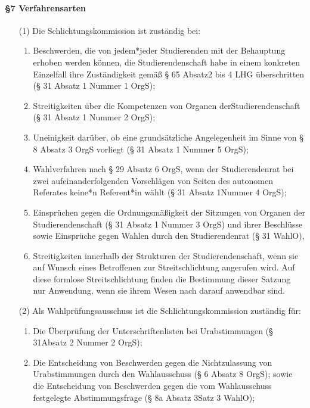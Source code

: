         \paragraph{§7 Verfahrensarten}
            \begin{itemize}
                \item[(1)]Die Schlichtungskommission ist zuständig bei:
                    \begin{enumerate}
                        \item Beschwerden, die von jedem*jeder Studierenden mit der Behauptung erhoben werden können, die Studierendenschaft habe in einem konkreten Einzelfall ihre Zuständigkeit gemäß § 65 Absatz2 bis 4 LHG überschritten (§ 31 Absatz 1 Nummer 1 OrgS);
                        \item Streitigkeiten über die Kompetenzen von Organen derStudierendenschaft (§ 31 Absatz 1 Nummer 2 OrgS);
                        \item Uneinigkeit darüber, ob eine grundsätzliche Angelegenheit im Sinne von § 8 Absatz 3 OrgS vorliegt (§ 31 Absatz 1 Nummer 5 OrgS);
                        \item Wahlverfahren nach § 29 Absatz 6 OrgS, wenn der Studierendenrat bei zwei aufeinanderfolgenden Vorschlägen von Seiten des autonomen Referates keine*n Referent*in wählt (§ 31 Absatz 1Nummer 4 OrgS);
                        \item Einsprüchen gegen die Ordnungsmäßigkeit der Sitzungen von Organen der Studierendenschaft (§ 31 Absatz 1 Nummer 3 OrgS) und ihrer Beschlüsse sowie Einsprüche gegen Wahlen durch den Studierendenrat (§ 31 WahlO),
                        \item Streitigkeiten innerhalb der Strukturen der Studierendenschaft, wenn sie auf Wunsch eines Betroffenen zur Streitschlichtung angerufen wird. Auf diese formlose Streitschlichtung finden die Bestimmung dieser Satzung nur Anwendung, wenn sie ihrem Wesen nach darauf anwendbar sind.
                    \end{enumerate}
                \item[(2)]  Als Wahlprüfungsausschuss ist die Schlichtungskommission zuständig für: 
                    \begin{enumerate}
                        \item Die Überprüfung der Unterschriftenlisten bei Urabstimmungen (§ 31Absatz 2 Nummer 2 OrgS);
                        \item Die Entscheidung von Beschwerden gegen die Nichtzulassung von Urabstimmungen durch den Wahlausschuss (§ 6 Absatz 8 OrgS); sowie die Entscheidung von Beschwerden gegen die vom Wahlausschuss festgelegte Abstimmungsfrage (§ 8a Absatz 3Satz 3 WahlO);

\end{enumerate}
\end{itemize}
